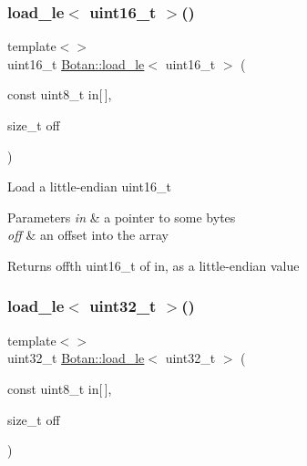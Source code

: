 \subsubsection{\texorpdfstring{load\+\_\+le$<$ uint16\+\_\+t $>$()}{load\_le< uint16\_t >()}}
{\footnotesize\ttfamily template$<$$>$ \\
uint16\+\_\+t \hyperlink{namespace_botan_a745efa1d08234fe3b785f17c19ec26b7}{Botan\+::load\+\_\+le}$<$ uint16\+\_\+t $>$ (\begin{DoxyParamCaption}\item[{const uint8\+\_\+t}]{in\mbox{[}$\,$\mbox{]},  }\item[{size\+\_\+t}]{off }\end{DoxyParamCaption})\hspace{0.3cm}{\ttfamily [inline]}}

Load a little-\/endian uint16\+\_\+t 
\begin{DoxyParams}{Parameters}
{\em in} & a pointer to some bytes \\
\hline
{\em off} & an offset into the array \\
\hline
\end{DoxyParams}
\begin{DoxyReturn}{Returns}
off\textquotesingle{}th uint16\+\_\+t of in, as a little-\/endian value 
\end{DoxyReturn}
\mbox{\label{namespace_botan_a2d9442a9a8c4177d35388d0c82f7f2e0}} 
\subsubsection{\texorpdfstring{load\+\_\+le$<$ uint32\+\_\+t $>$()}{load\_le< uint32\_t >()}}
{\footnotesize\ttfamily template$<$$>$ \\
uint32\+\_\+t \hyperlink{namespace_botan_a745efa1d08234fe3b785f17c19ec26b7}{Botan\+::load\+\_\+le}$<$ uint32\+\_\+t $>$ (\begin{DoxyParamCaption}\item[{const uint8\+\_\+t}]{in\mbox{[}$\,$\mbox{]},  }\item[{size\+\_\+t}]{off }\end{DoxyParamCaption})\hspace{0.3cm}{\ttfamily [inline]}}


